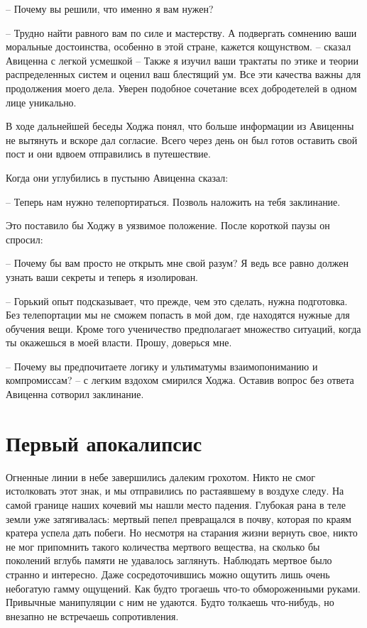 \documentclass[12pt,a4paper]{article}
\begin{document}
-- Почему вы решили, что именно я вам нужен?

-- Трудно найти равного вам по силе и мастерству. А подвергать сомнению ваши моральные достоинства, особенно в этой стране, кажется кощунством. -- сказал Авиценна с легкой усмешкой -- Также я изучил ваши трактаты по этике и теории распределенных систем и оценил ваш блестящий ум. Все эти качества важны для продолжения моего дела. Уверен подобное сочетание всех добродетелей в одном лице уникально.

В ходе дальнейшей беседы Ходжа понял, что больше информации из Авиценны не вытянуть и вскоре дал согласие. Всего через день он был готов оставить свой пост и они вдвоем отправились в путешествие.

Когда они углубились в пустыню Авиценна сказал:

-- Теперь нам нужно телепортираться. Позволь наложить на тебя заклинание.

Это поставило бы Ходжу в уязвимое положение. После короткой паузы он спросил:

-- Почему бы вам просто не открыть мне свой разум? Я ведь все равно должен узнать ваши секреты и теперь я изолирован.

-- Горький опыт подсказывает, что прежде, чем это сделать, нужна подготовка. Без телепортации мы не сможем попасть в мой дом, где находятся нужные для обучения вещи. Кроме того ученичество предполагает множество ситуаций, когда ты окажешься в моей власти. Прошу, доверься мне.

-- Почему вы предпочитаете логику и ультиматумы взаимопониманию и компромиссам? -- с легким вздохом смирился Ходжа.
Оставив вопрос без ответа Авиценна сотворил заклинание.


\section*{Первый апокалипсис}

Огненные линии в небе завершились далеким грохотом. Никто не смог истолковать этот знак, и мы отправились по растаявшему в воздухе следу. На самой границе наших кочевий мы нашли место падения. Глубокая рана в теле земли уже затягивалась: мертвый пепел превращался в почву, которая по краям кратера успела дать побеги. Но несмотря на старания жизни вернуть свое, никто не мог припомнить такого количества мертвого вещества, на сколько бы поколений вглубь памяти не удавалось заглянуть. Наблюдать мертвое было странно и интересно. Даже сосредоточившись можно ощутить лишь очень небогатую гамму ощущений. Как будто трогаешь что-то обмороженными руками. Привычные манипуляции с ним не удаются. Будто толкаешь что-нибудь, но внезапно не встречаешь сопротивления.
\end{document}
